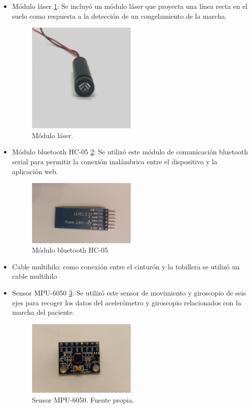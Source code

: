 \begin{itemize}
\item Módulo láser \ref{fig:laser}: Se incluyó un módulo láser que proyecta una línea recta en el suelo como respuesta a la detección de un congelamiento de la marcha.
\begin{figure}
    \centering
    \includegraphics[width=0.5\textwidth]{img/laser.jpg}
    \caption{Módulo láser. \cite{LaserModule}}
    \label{fig:laser}
\end{figure}
\item Módulo bluetooth HC-05 \ref{fig:bluetooth}: Se utilizó este módulo de comunicación bluetooth serial para permitir la conexión inalámbrica entre el dispositivo y la aplicación web.
\begin{figure}
    \centering
    \includegraphics[width=0.5\textwidth]{img/bluetooth.jpg}
    \caption{Módulo bluetooth HC-05}
    \label{fig:bluetooth}
\end{figure}
\item Cable multihilo: como conexión entre el cinturón y la tobillera se utilizó un cable multihilo
\item Sensor MPU-6050 \ref{fig:mpu}: Se utilizó este sensor de movimiento y giroscopio de seis ejes para recoger los datos del acelerómetro y giroscopio relacionados con la marcha del paciente.

\begin{figure}
    \centering
    \includegraphics[width=0.5\textwidth]{img/mpu6050.jpg}
    \caption{Sensor MPU-6050. Fuente propia.}
    \label{fig:mpu}
\end{figure}
\end{itemize}

